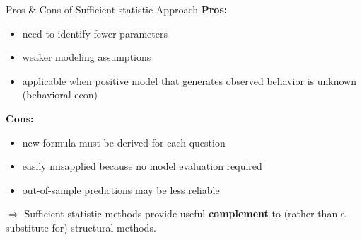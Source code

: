 \documentclass{beamer}
\begin{document}
\begin{frame}{Pros \& Cons of Sufficient-statistic Approach}
	\textbf{Pros:}
	\begin{itemize}
		\item need to identify fewer parameters
		\item weaker modeling assumptions
		\item applicable when positive model that generates observed behavior is unknown (behavioral econ)
	\end{itemize}
	\textbf{Cons:}
	\begin{itemize}
		\item new formula must be derived for each question
		\item easily misapplied because no model evaluation required
		\item out-of-sample predictions may be less reliable
	\end{itemize}
	\medskip
	$\Rightarrow$ Sufficient statistic methods provide useful \textbf{complement} to (rather than a substitute for) structural methods.
\end{frame}
\end{document}

